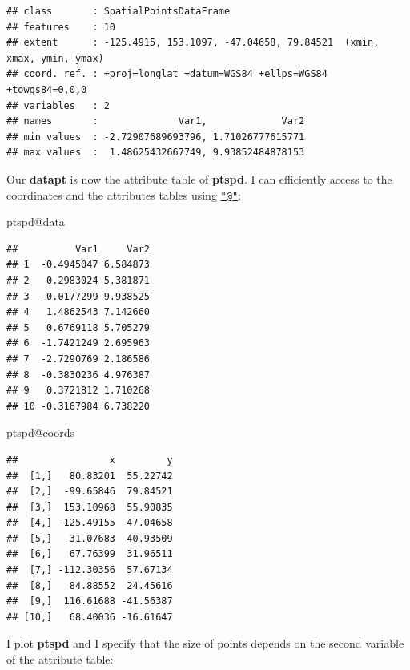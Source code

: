 \documentclass[]{report}
\newenvironment{Shaded}{\begin{snugshade}}{\end{snugshade}}
\newcommand{\KeywordTok}[1]{\textcolor[rgb]{0.13,0.29,0.53}{\textbf{{#1}}}}
\newcommand{\DataTypeTok}[1]{\textcolor[rgb]{0.13,0.29,0.53}{{#1}}}
\newcommand{\DecValTok}[1]{\textcolor[rgb]{0.00,0.00,0.81}{{#1}}}
\newcommand{\NormalTok}[1]{{#1}}
\begin{document}
\begin{verbatim}
## class       : SpatialPointsDataFrame 
## features    : 10 
## extent      : -125.4915, 153.1097, -47.04658, 79.84521  (xmin, xmax, ymin, ymax)
## coord. ref. : +proj=longlat +datum=WGS84 +ellps=WGS84 +towgs84=0,0,0 
## variables   : 2
## names       :              Var1,             Var2 
## min values  : -2.72907689693796, 1.71026777615771 
## max values  :  1.48625432667749, 9.93852484878153
\end{verbatim}

Our \textbf{datapt} is now the attribute table of \textbf{ptspd}. I can
efficiently access to the coordinates and the attributes tables using
\href{mailto:\%22@\%22}{\nolinkurl{"@"}}:

\begin{Shaded}
\begin{Highlighting}[]
\NormalTok{ptspd@data}
\end{Highlighting}
\end{Shaded}

\begin{verbatim}
##          Var1     Var2
## 1  -0.4945047 6.584873
## 2   0.2983024 5.381871
## 3  -0.0177299 9.938525
## 4   1.4862543 7.142660
## 5   0.6769118 5.705279
## 6  -1.7421249 2.695963
## 7  -2.7290769 2.186586
## 8  -0.3830236 4.976387
## 9   0.3721812 1.710268
## 10 -0.3167984 6.738220
\end{verbatim}

\begin{Shaded}
\begin{Highlighting}[]
\NormalTok{ptspd@coords}
\end{Highlighting}
\end{Shaded}

\begin{verbatim}
##                x         y
##  [1,]   80.83201  55.22742
##  [2,]  -99.65846  79.84521
##  [3,]  153.10968  55.90835
##  [4,] -125.49155 -47.04658
##  [5,]  -31.07683 -40.93509
##  [6,]   67.76399  31.96511
##  [7,] -112.30356  57.67134
##  [8,]   84.88552  24.45616
##  [9,]  116.61688 -41.56387
## [10,]   68.40036 -16.61647
\end{verbatim}

I plot \textbf{ptspd} and I specify that the size of points depends on
the second variable of the attribute table:

\begin{Shaded}
\end{Shaded}
\end{document}

